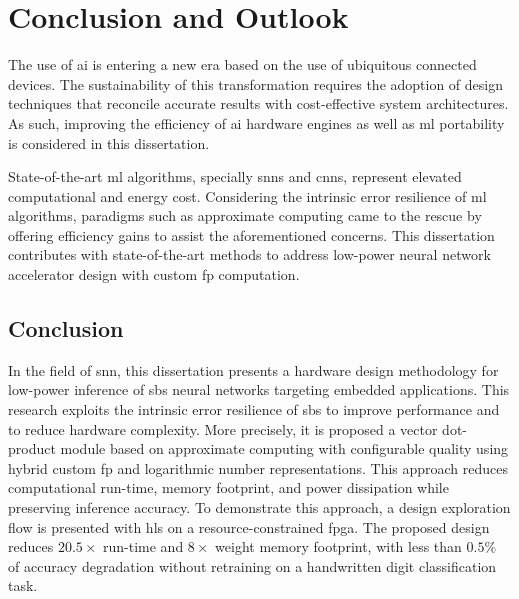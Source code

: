 \chapter{Conclusion and Outlook}
\label{chap.conclusion}
\minitoc
The use of \gls{ai} is entering a new era based on the use of ubiquitous connected devices. The sustainability of this transformation requires the adoption of design techniques that reconcile accurate results with cost-effective system architectures. As such, improving the efficiency of \gls{ai} hardware engines as well as \gls{ml} portability is considered in this dissertation.

State-of-the-art \gls{ml} algorithms, specially \glspl{snn} and \glspl{cnn}, represent elevated computational and energy cost. Considering the intrinsic error resilience of \gls{ml} algorithms, paradigms such as approximate computing came to the rescue by offering efficiency gains to assist the aforementioned concerns. This dissertation contributes with state-of-the-art methods to address low-power neural network accelerator design with custom \gls{fp} computation.

\section{Conclusion}

In the field of \gls{snn}, this dissertation presents a hardware design methodology for low-power inference of \gls{sbs} neural networks targeting embedded applications. This research exploits the intrinsic error resilience of \gls{sbs} to improve performance and to reduce hardware complexity. More precisely, it is proposed a vector dot-product module based on approximate computing with configurable quality using hybrid custom \gls{fp} and logarithmic number representations. This approach reduces computational run-time, memory footprint, and power dissipation while preserving inference accuracy. To demonstrate this approach, a design exploration flow is presented with \gls{hls} on a resource-constrained \gls{fpga}. The proposed design reduces $20.5\times$ run-time and $8\times$ weight memory footprint, with less than $0.5\%$ of accuracy degradation without retraining on a handwritten digit classification task.

